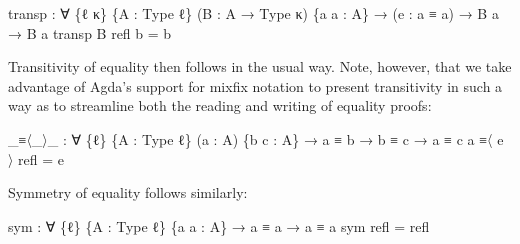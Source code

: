 \documentclass[
  11pt,
  oneside,
  article]{memoir}
\newenvironment{Shaded}{}{}
\newcommand{\NormalTok}[1]{#1}
\newcommand{\OtherTok}[1]{\textcolor[rgb]{0.00,0.44,0.13}{#1}}
\theoremstyle{definition}
\theoremstyle{plain}
\newcommand{\0}{\textsf{0}}
\newcommand{\1}{\tn{\textsf{1}}}
\begin{document}
\begin{Shaded}
\begin{Highlighting}[]
\NormalTok{transp }\OtherTok{:} \OtherTok{∀} \OtherTok{\{}\NormalTok{ℓ κ}\OtherTok{\}} \OtherTok{\{}\NormalTok{A }\OtherTok{:}\NormalTok{ Type ℓ}\OtherTok{\}} \OtherTok{(}\NormalTok{B }\OtherTok{:}\NormalTok{ A }\OtherTok{→}\NormalTok{ Type κ}\OtherTok{)} \OtherTok{\{}\NormalTok{a a\textquotesingle{} }\OtherTok{:}\NormalTok{ A}\OtherTok{\}} 
         \OtherTok{→} \OtherTok{(}\NormalTok{e }\OtherTok{:}\NormalTok{ a ≡ a\textquotesingle{}}\OtherTok{)} \OtherTok{→}\NormalTok{ B a }\OtherTok{→}\NormalTok{ B a\textquotesingle{}}
\NormalTok{transp B refl b }\OtherTok{=}\NormalTok{ b}
\end{Highlighting}
\end{Shaded}

Transitivity of equality then follows in the usual way. Note, however,
that we take advantage of Agda's support for mixfix notation to present
transitivity in such a way as to streamline both the reading and writing
of equality proofs:

\begin{Shaded}
\begin{Highlighting}[]
\OtherTok{\_}\NormalTok{≡〈}\OtherTok{\_}\NormalTok{〉}\OtherTok{\_} \OtherTok{:} \OtherTok{∀} \OtherTok{\{}\NormalTok{ℓ}\OtherTok{\}} \OtherTok{\{}\NormalTok{A }\OtherTok{:}\NormalTok{ Type ℓ}\OtherTok{\}} \OtherTok{(}\NormalTok{a }\OtherTok{:}\NormalTok{ A}\OtherTok{)} \OtherTok{\{}\NormalTok{b c }\OtherTok{:}\NormalTok{ A}\OtherTok{\}} 
          \OtherTok{→}\NormalTok{ a ≡ b }\OtherTok{→}\NormalTok{ b ≡ c }\OtherTok{→}\NormalTok{ a ≡ c}
\NormalTok{a ≡〈 e 〉 refl }\OtherTok{=}\NormalTok{ e}
\end{Highlighting}
\end{Shaded}

Symmetry of equality follows similarly:

\begin{Shaded}
\begin{Highlighting}[]
\NormalTok{sym }\OtherTok{:} \OtherTok{∀} \OtherTok{\{}\NormalTok{ℓ}\OtherTok{\}} \OtherTok{\{}\NormalTok{A }\OtherTok{:}\NormalTok{ Type ℓ}\OtherTok{\}} \OtherTok{\{}\NormalTok{a a\textquotesingle{} }\OtherTok{:}\NormalTok{ A}\OtherTok{\}} \OtherTok{→}\NormalTok{ a ≡ a\textquotesingle{} }\OtherTok{→}\NormalTok{ a\textquotesingle{} ≡ a}
\NormalTok{sym refl }\OtherTok{=}\NormalTok{ refl}
\end{Highlighting}
\end{Shaded}
\end{document}
